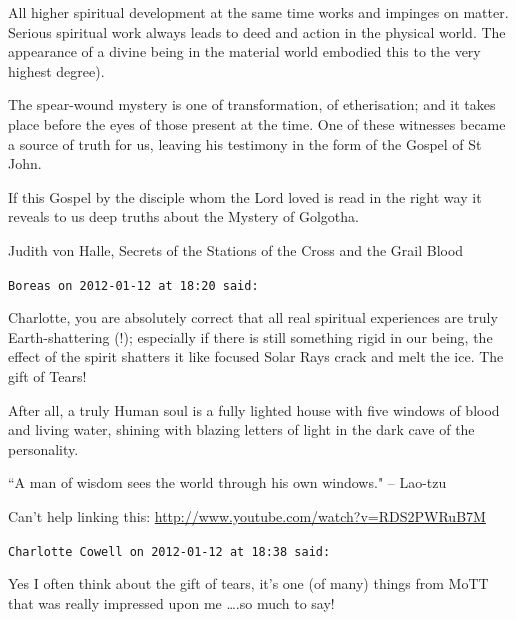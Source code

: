 \begin{footnotesize}
\begin{sffamily}
All higher spiritual development at the same time works and impinges on matter. Serious spiritual work always leads to deed and action in the physical world. The appearance of a divine being in the material world embodied this to the very highest degree).

The spear-wound mystery is one of transformation, of etherisation; and it takes place before the eyes of those present at the time. One of these witnesses became a source of truth for us, leaving his testimony in the form of the Gospel of St John.

If this Gospel by the disciple whom the Lord loved is read in the right way it reveals to us deep truths about the Mystery of Golgotha.

Judith von Halle, Secrets of the Stations of the Cross and the Grail Blood


\hfill

\texttt{Boreas on 2012-01-12 at 18:20 said: }

Charlotte, you are absolutely correct that all real spiritual experiences are truly Earth-shattering (!); especially if there is still something rigid in our being, the effect of the spirit shatters it like focused Solar Rays crack and melt the ice. The gift of Tears!

After all, a truly Human soul is a fully lighted house with five windows of blood and living water, shining with blazing letters of light in the dark cave of the personality.

``A man of wisdom sees the world through his own windows." – Lao-tzu

Can't help linking this: \url{http://www.youtube.com/watch?v=RDS2PWRuB7M}


\hfill

\texttt{Charlotte Cowell on 2012-01-12 at 18:38 said: }

Yes I often think about the gift of tears, it's one (of many) things from MoTT that was really impressed upon me ….so much to say!


\end{sffamily}\end{footnotesize}
